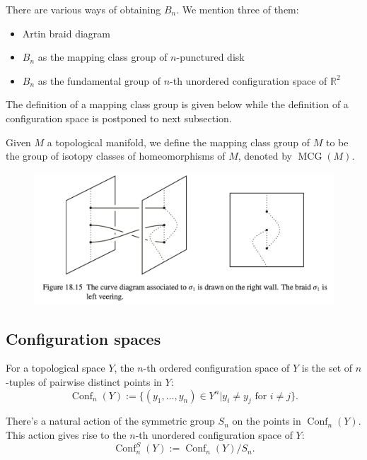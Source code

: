 \documentclass{article}
\DeclareMathOperator{\Conf}{Conf}
\DeclareMathOperator{\MCG}{MCG}
\begin{document}
There are various ways of obtaining $B_{n}$. We mention three of them:
\begin{itemize}
    \item Artin braid diagram 
    \item $B_{n}$ as the mapping class group of $n$-punctured disk 
    \item $B_{n}$ as the fundamental group of $n$-th unordered configuration space of $\mathbb{R}^{2}$ 
\end{itemize}
The definition of a mapping class group is given below while the definition of a configuration space is postponed to next subsection.

\begin{definition}
Given $M$ a topological manifold, we define the mapping class group of $M$ to be the group of isotopy classes of homeomorphisms of $M$, denoted by $\MCG(M)$. 
\end{definition}

\begin{figure}[hbt!]
\label{fig:cc}
\small
\centering
\includegraphics[scale = 0.6]{Pics/4.png}
\end{figure}
\leavevmode

\subsection{Configuration spaces}

\begin{definition}
For a topological space $Y$, the $n$-th ordered configuration space of $Y$ is the set of $n$-tuples of pairwise distinct points in $Y$: 
\[
\Conf_{n}(Y) := \{(y_{1}, \ldots, y_{n}) \in Y^{n}| y_{i} \neq y_{j} \text{ for $i \neq j$}\}.  
\]
\end{definition}

\begin{definition}
There's a natural action of the symmetric group $S_{n}$ on the points in $\Conf_{n}(Y)$. This action gives rise to the $n$-th unordered configuration space of $Y$: 
\[
\Conf^{S}_{n}(Y) := \Conf_{n}(Y)/S_{n}.   
\]
\end{definition}
\end{document}

